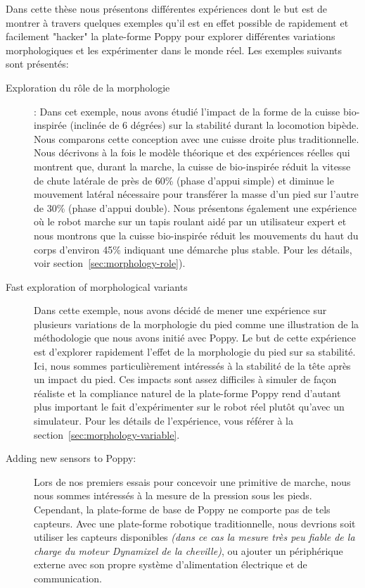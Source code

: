 Dans cette thèse nous présentons différentes expériences dont le but est de montrer à travers quelques exemples qu'il est en effet possible de rapidement et facilement "hacker" la plate-forme Poppy pour explorer différentes variations morphologiques et les expérimenter dans le monde réel. 
Les exemples suivants sont présentés:
\begin{description}
    \item[Exploration du rôle de la morphologie]: Dans cet exemple, nous avons étudié l'impact de la forme de la cuisse bio-inspirée (inclinée de 6 dégrées) sur la stabilité durant la locomotion bipède. Nous comparons cette conception avec une cuisse droite plus traditionnelle. Nous décrivons à la fois le modèle théorique et des expériences réelles qui montrent que, durant la marche, la cuisse de bio-inspirée réduit la vitesse de chute latérale de près de 60\% (phase d'appui simple) et diminue le mouvement latéral nécessaire pour transférer la  masse d'un pied sur l'autre de 30\% (phase d'appui double). Nous présentons également une expérience où le robot marche sur un tapis roulant aidé par un utilisateur expert et nous montrons que la cuisse bio-inspirée réduit les mouvements du haut du corps d'environ 45\% indiquant une démarche plus stable. Pour les détails, voir section~\ref{sec:morphology-role}).

    \item[Fast exploration of morphological variants] Dans cette exemple, nous avons décidé de mener une expérience sur plusieurs variations de la morphologie du pied comme une illustration de la méthodologie que nous avons initié avec Poppy.
    Le but de cette expérience est d'explorer rapidement l'effet de la morphologie du pied sur sa stabilité. Ici, nous sommes particulièrement intéressés à la stabilité de la tête après un impact du pied. Ces impacts sont assez difficiles à simuler de façon réaliste et la compliance naturel de la plate-forme Poppy rend d'autant plus important le fait d'expérimenter sur le robot réel plutôt qu'avec un simulateur. Pour les détails de l'expérience, vous référer à la section~\ref{sec:morphology-variable}.
    \item[Adding new sensors to Poppy:]Lors de nos premiers essais pour concevoir une primitive de marche, nous nous sommes intéressés à la mesure de la pression sous les pieds. Cependant, la plate-forme de base de Poppy ne comporte pas de tels capteurs. Avec une plate-forme robotique traditionnelle, nous devrions soit utiliser les capteurs disponibles \emph{(dans ce cas la mesure très peu fiable de la charge du moteur Dynamixel de la cheville)}, ou ajouter un périphérique externe avec son propre système d'alimentation électrique et de communication.


\end{description}
